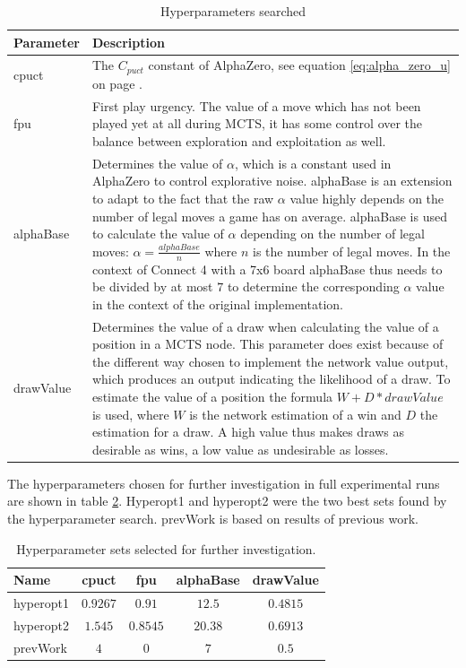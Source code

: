 \documentclass[12pt,onecolumn,oneside,titlepage]{article}
\begin{document}
\begin{table}[H]
  \centering
    \begin{tabularx}{\textwidth}{lX}
    \toprule
    Parameter     & Description \\
    \midrule
    cpuct          & The $C_{puct}$ constant of AlphaZero, see equation \ref{eq:alpha_zero_u} on page \pageref{eq:alpha_zero_u}. \\
    \hline
    fpu          & First play urgency. The value of a move which has not been played yet at all during MCTS, it has some control over the balance between exploration and exploitation as well. \\
    \hline
    alphaBase          & Determines the value of $\alpha$, which is a constant used in AlphaZero to control explorative noise. alphaBase is an extension to adapt to the fact that the raw $\alpha$ value highly depends on the number of legal moves a game has on average.
      alphaBase is used to calculate the value of $\alpha$ depending on the number of legal moves: $\alpha = \frac{alphaBase}{n}$ where $n$ is the number of legal moves. 
      In the context of Connect 4 with a 7x6 board alphaBase thus needs to be divided by at most $7$ to determine the corresponding $\alpha$ value in the context of the original implementation. \\
      \hline 
    drawValue & Determines the value of a draw when calculating the value of a position in a MCTS node. This parameter does exist because of the different way chosen to implement the network value output, which produces
  an output indicating the likelihood of a draw. To estimate the value of a position the formula $W + D*drawValue$ is used, where $W$ is the network estimation of a win and $D$ the estimation for a draw. A high value thus makes draws
  as desirable as wins, a low value as undesirable as losses.\\
    \bottomrule
    \end{tabularx}%
  \label{tab:addlabel}%
  \caption{Hyperparameters searched}
  \label{t:hyperparameters}
\end{table}

The hyperparameters chosen for further investigation in full experimental runs are shown in table \ref{t:hyper_search_results}. Hyperopt1 and hyperopt2 were the two best sets found by the hyperparameter search. prevWork is based on results of previous work.

\begin{table} [H]
 \centering
  \begin{tabular}{ l | c c c c }
  Name & cpuct & fpu & alphaBase & drawValue \\
  \hline
  hyperopt1 & $0.9267$ & $0.91$ & $12.5$ & $0.4815$ \\
  hyperopt2 & $1.545$ & $0.8545$ & $20.38$ & $0.6913$ \\
  prevWork & $4$ & $0$ & $7$ & $0.5$ \\
  \end{tabular}
  \caption{Hyperparameter sets selected for further investigation.}
  \label{t:hyper_search_results}
\end{table}
\end{document}

